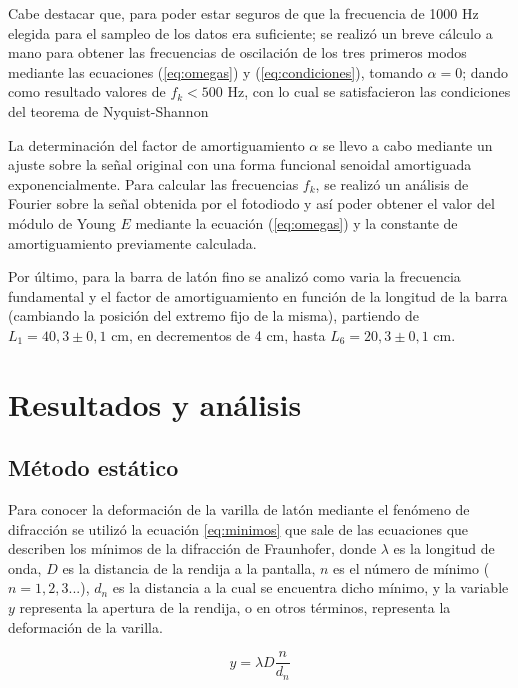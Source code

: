 \documentclass[twoside,twocolumn,a4paper]{article}
\begin{document}
Cabe destacar que, para poder estar seguros de que la frecuencia de 1000 Hz elegida para el sampleo de los datos era suficiente; se realiz\'o un breve c\'alculo a mano para obtener las frecuencias de oscilaci\'on de los tres primeros modos mediante las ecuaciones (\ref{eq:omegas}) y (\ref{eq:condiciones}), tomando $\alpha = 0$; dando como resultado valores de $f_{k} < 500$ Hz, con lo cual se satisfacieron las condiciones del teorema de Nyquist-Shannon \cite{teo:shannon}

La determinaci\'on del factor de amortiguamiento $\alpha$ se llevo a cabo mediante un ajuste sobre la se\~nal original con una forma funcional senoidal amortiguada exponencialmente.
Para calcular las frecuencias $f_{k}$, se realiz\'o un an\'alisis de Fourier sobre la se\~nal obtenida por el fotodiodo y as\'i poder obtener el valor del m\'odulo de Young $E$ mediante la ecuaci\'on (\ref{eq:omegas}) y la constante de amortiguamiento previamente calculada.

Por \'ultimo, para la barra de lat\'on fino se analiz\'o como varia la frecuencia fundamental y el factor de amortiguamiento en funci\'on de la longitud de la barra (cambiando la posici\'on del extremo fijo de la misma), partiendo de $L_{1} = 40,3 \pm 0,1$ cm, en decrementos de 4 cm, hasta $L_{6} = 20,3 \pm 0,1$ cm.



\section{Resultados y an\'alisis}

\subsection{M\'etodo est\'atico}

Para conocer la deformaci\'on de la varilla de lat\'on mediante el fen\'omeno de difracci\'on se utiliz\'o la ecuaci\'on \ref{eq:minimos} que sale de las ecuaciones que describen los m\'inimos de la  difracci\'on de  Fraunhofer, donde $\lambda$  es la longitud de onda, $D$ es la distancia de la rendija a la pantalla, $n$ es el n\'umero de m\'inimo ($n = 1, 2, 3...$), $d_{n}$ es la distancia a la cual se encuentra dicho m\'inimo, y la variable $y$ representa la apertura de la rendija, o en otros t\'erminos, representa la deformaci\'on de la varilla.

\begin{equation}
\label{eq:minimos}
y= \lambda D \frac{n}{d_{n}}
\end{equation}
\end{document}
